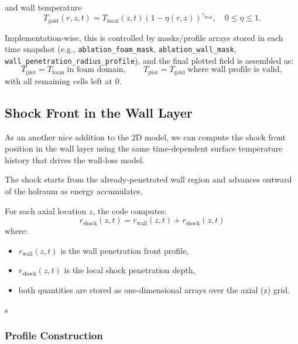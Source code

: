 \documentclass[12pt,a4paper]{article}
\begin{document}
and wall temperature
\begin{equation}
T_{\mathrm{gold}}(r,z,t)=T_{\mathrm{local}}(z,t)\left(1-\eta(r,z)\right)^{\gamma_{\mathrm{wall}}},\quad 0\le\eta\le1.
\end{equation}

Implementation-wise, this is controlled by masks/profile arrays stored in each time snapshot (e.g., \texttt{ablation\_foam\_mask}, \texttt{ablation\_wall\_mask}, \texttt{wall\_penetration\_radius\_profile}), and the final plotted field is assembled as:
\begin{equation}
T_{\mathrm{plot}} = T_{\mathrm{foam}}\;\text{in foam domain},\qquad
T_{\mathrm{plot}} = T_{\mathrm{gold}}\;\text{where wall profile is valid},
\end{equation}
with all remaining cells left at $0$.

\subsection{Shock Front in the Wall Layer}

As an another nice addition to the 2D model, we can compute the shock front position in the wall layer using the same time-dependent surface temperature history that drives the wall-loss model. 

The shock starts from the already-penetrated wall region and advances outward of the holraum as energy accumulates. 

For each axial location $z$, the code computes:
\begin{equation}
r_{\text{shock}}(z,t) = r_{\text{wall}}(z,t) + r_{\text{shock}}(z,t)
\end{equation}
where:
\begin{itemize}
    \item $r_{\text{wall}}(z,t)$ is the wall penetration front profile,
    \item $r_{\text{shock}}(z,t)$ is the local shock penetration depth,
    \item both quantities are stored as one-dimensional arrays over the axial (z) grid.
\end{itemize}s

\subsubsection*{Profile Construction}
\end{document}
